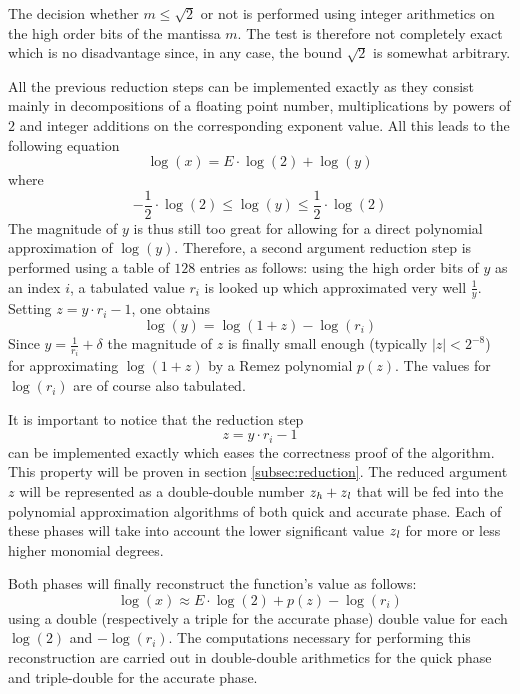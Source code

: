 The decision whether $m \leq \sqrt{2}$ or not is performed using integer arithmetics on 
the high order bits of the mantissa $m$. The test is therefore not completely exact which is no
disadvantage since, in any case, the bound $\sqrt{2}$ is somewhat arbitrary.\par
All the previous reduction steps can be implemented exactly as they consist mainly in decompositions
of a floating point number, multiplications by powers of $2$ and integer additions on the corresponding exponent value.
All this leads to the following equation 
$$\log\left( x \right) = E \cdot \log\left( 2 \right) + \log\left( y \right)$$
where
$$-\frac{1}{2} \cdot \log\left( 2 \right) \leq \log\left( y \right) \leq \frac{1}{2} \cdot \log\left( 2 \right)$$
The magnitude of $y$ is thus still too great for allowing for a direct polynomial approximation of $\log\left(y\right)$.
Therefore, a second argument reduction step is performed using a table of $128$ entries as follows:
using the high order bits of $y$ as an index $i$, a tabulated value $r_i$ is looked up which approximated very well
$\frac{1}{y}$. Setting $z = y \cdot r_i - 1$, one obtains 
$$\log\left( y \right) = \log\left( 1 + z \right) - \log\left( r_i \right)$$
Since $y = \frac{1}{r_i} + \delta$ the magnitude of $z$ is finally
small enough (typically $\left \vert z \right \vert < 2^{-8}$) for
approximating $\log\left(1+z\right)$ by a Remez polynomial
$p\left(z\right)$. The values for $\log\left(r_i\right)$ are of course also tabulated.

It is important to notice that the reduction step 
$$z = y \cdot r_i - 1$$ 
can be implemented exactly which eases the correctness proof of the algorithm. This property will be proven in 
section \ref{subsec:reduction}. The reduced argument $z$ will
be represented as a double-double number $z_{\mathit{h}} + z_{\mathit{l}}$ that will be fed into the polynomial approximation 
algorithms of both quick and accurate phase. Each of these phases will take into account the lower significant value 
$z_{\mathit{l}}$ for more or less 
higher monomial degrees.

Both phases will finally reconstruct the function's value as follows:
$$\log\left( x \right) \approx E \cdot \log\left( 2 \right) + p\left( z \right) - \log\left( r_i \right)$$
using a double (respectively a triple for the accurate phase) double value for each 
$\log\left( 2 \right)$ and $-\log\left( r_i \right)$. The computations necessary for performing this reconstruction
are carried out in double-double arithmetics for the quick phase and triple-double for the accurate phase.

